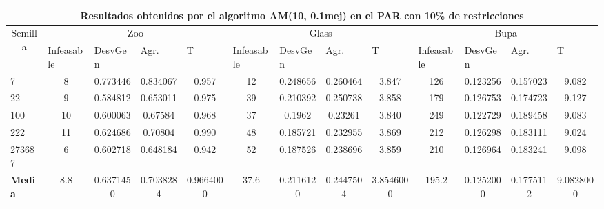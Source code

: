 \begin{table}[H]
\begin{adjustwidth}{-1cm}{-1cm}
	\begin{tabular}{|l|c|c|c|c|c|c|c|c|c|c|c|c|}
	\hline
	\multicolumn{13}{|c|}{\textbf{Resultados obtenidos por el algoritmo AM(10, 0.1mej) en el PAR con 10\% de restricciones}}                                                                                                                                                                                                                                                                                                                                            \\ \hline
	\multicolumn{1}{|c|}{\multirow{2}{*}{Semilla}} & \multicolumn{4}{c|}{Zoo}                                                                                          & \multicolumn{4}{c|}{Glass}                                                                                         & \multicolumn{4}{c|}{Bupa}                                                                                          \\ \cline{2-13} 
	\multicolumn{1}{|c|}{}                                  & \multicolumn{1}{l|}{Infeasable} & \multicolumn{1}{l|}{DesvGen} & \multicolumn{1}{l|}{Agr.} & \multicolumn{1}{l|}{T} & \multicolumn{1}{l|}{Infeasable} & \multicolumn{1}{l|}{DesvGen} & \multicolumn{1}{l|}{Agr.} & \multicolumn{1}{l|}{T} & \multicolumn{1}{l|}{Infeasable} & \multicolumn{1}{l|}{DesvGen} & \multicolumn{1}{l|}{Agr.} & \multicolumn{1}{l|}{T} \\ \hline
	7   	& 8 & 0.773446 & 0.834067 & 0.957 &				12 & 0.248656 & 0.260464 & 3.847 &			 	126 & 0.123256 & 0.157023 & 9.082		\\ \hline
	22 		& 9 & 0.584812 & 0.653011 & 0.975 &				39 & 0.210392 & 0.250738 & 3.858 &		 	179 & 0.126753 & 0.174723 & 9.127		\\ \hline
	100 	& 10 & 0.600063 & 0.67584 & 0.968 &				37 & 0.1962 & 0.23261 & 3.840 &				249 & 0.122729 & 0.189458 & 9.083		\\ \hline
	222 	& 11 & 0.624686 & 0.70804 & 0.990 &				48 & 0.185721 & 0.232955 & 3.869 & 			212 & 0.126298 & 0.183111 & 9.024		\\ \hline
	273687 	& 6 & 0.602718 & 0.648184 & 0.942 &				52 & 0.187526 & 0.238696 & 3.859 &			210 & 0.126964 & 0.183241 & 9.098		\\ \hline
	\textbf{Media} &  8.8 & 	0.6371450 & 	0.7038284 & 	0.9664000 & 	37.6 & 	0.2116120	 & 0.2447504	 & 3.8546000 & 	195.2 & 	0.1252000 & 	0.1775112 & 	9.0828000  \\ \hline
	\end{tabular}
	
	\end{adjustwidth}
	
\end{table}



